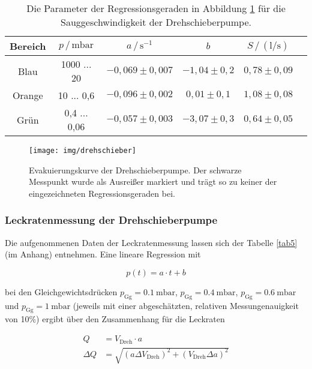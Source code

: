 \begin{table}
	\begin{center}
		\begin{tabular}{cccccc}
			\toprule
			Bereich & $p \, / \, \text{mbar}$ & $a \, / \, \text{s}^{-1}$ &        $b$        & $S \, / \, (\text{l}/\text{s})$ &  \\ \midrule
			 Blau   &       1000 ... 20       &    $-0,069 \pm 0,007 $    & $ -1,04 \pm 0,2 $ &      $ 0,78 \pm 0,09     $      &  \\
			Orange  &       10 ... 0,6        &    $-0,096 \pm 0,002$     &  $0,01 \pm 0,1 $  &      $  1,08 \pm 0,08   $       &  \\
			 Grün   &      0,4 ... 0,06       &    $-0,057 \pm 0,003$     & $ -3,07 \pm 0,3 $ &      $  0,64 \pm 0,05   $       &  \\ \bottomrule
		\end{tabular}
		\caption{Die Parameter der Regressionsgeraden in Abbildung \ref{fig:drehschieber} für die Sauggeschwindigkeit der Drehschieberpumpe.}
		\label{tab3}
	\end{center}
\end{table}

\begin{figure}
	\centering
	\texttt{[image: img/drehschieber]}
	\caption{Evakuierungskurve der Drehschieberpumpe. Der schwarze Messpunkt wurde als Ausreißer markiert und trägt so zu keiner der eingezeichneten Regressionsgeraden bei.}
	\label{fig:drehschieber}
\end{figure}


\subsubsection{Leckratenmessung der Drehschieberpumpe}

Die aufgenommenen Daten der Leckratenmessung lassen sich der Tabelle \ref{tab5} (im Anhang) entnehmen. Eine lineare Regression mit

\begin{equation}
p(t) = a \cdot t + b
\end{equation}

bei den Gleichgewichtsdrücken $p_\text{Gg} = \SI{0.1}{\milli \bar}$, $p_\text{Gg} = \SI{0.4}{\milli \bar}$, $p_\text{Gg} = \SI{0.6}{\milli \bar}$ und $p_\text{Gg} = \SI{1}{\milli \bar}$ (jeweils mit einer abgeschätzten, relativen Messungenauigkeit von 10\%) ergibt über den Zusammenhang für die Leckraten


\begin{align}
	Q &= V_\text{Dreh} \cdot a\\
	\Delta Q &= \sqrt{\left(a \Delta V_\text{Dreh} \right)^2 + \left(V_\text{Dreh} \Delta a\right)^2}
\end{align}

